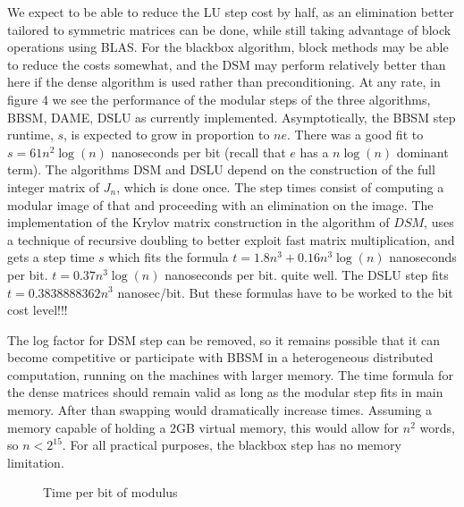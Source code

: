 \documentclass{sig-alternate}
\begin{document}
We expect to be able to reduce the LU step cost
by half, as an elimination better tailored to symmetric matrices can be done, while still taking
advantage of block operations using BLAS. For the blackbox algorithm, block methods may 
be able to reduce the costs somewhat, and the DSM may perform relatively better than
here if the dense \charpoly{} algorithm \cite{Pernet03} %
is used rather than preconditioning.
At any rate, in figure 4 we see the performance of the modular steps of the three algorithms,
BBSM, DAME, DSLU as currently implemented.
Asymptotically, the BBSM step runtime, $s$, is expected to grow in
proportion to $ne$. There was a good fit to $s = 61 n^2\log(n)$ nanoseconds per bit
(recall that $e$ has a $n\log(n)$ dominant term).
The algorithms DSM and DSLU depend on the construction of the full integer matrix of 
$J_n$, which is done once.  The step times consist of computing a modular
image of that and proceeding with an elimination on the image.
The implementation of the Krylov matrix construction in the \minpoly{} algorithm of $DSM$,
uses a technique of recursive doubling to better exploit fast matrix multiplication,
and gets a step time $s$ which fits the formula 
$t = 1.8   n^3  + 0.16  n^3 \log(n)$ nanoseconds per bit.
$t = 0.37 n^3 \log(n)$ nanoseconds per bit.
quite well.  
The DSLU step fits 
$t = 0.3838888362 n^3$ nanosec/bit.
But these formulas have to be worked to the bit cost level!!!

The log factor for DSM step can be removed, so it remains possible that it can become 
competitive or participate with BBSM in a heterogeneous distributed computation, running
on the machines with larger memory.  
The time formula for the dense matrices should remain valid as long as the modular
step fits in main memory. After than swapping would dramatically increase times.
Assuming a memory capable of holding a 2GB virtual memory,
this would allow for $n^2$ words, so $n < 2^{15}$.  For all practical purposes,
the blackbox step has no memory limitation.
\begin{figure}[h]
\caption{Time per bit of modulus}
\end{figure}
\end{document}
